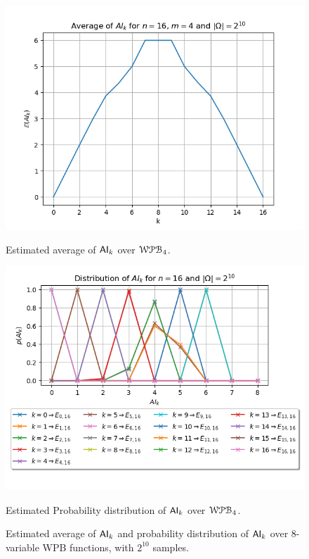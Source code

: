 \documentclass[11pt]{llncs}
\begin{document}
\begin{figure}[H]
    \centering
    \begin{minipage}[b]{0.45\textwidth}
        \centering
        \includegraphics[width=\textwidth]{images/WPB_4_sample_size_1024_average_a.png}
        \caption{Estimated average of $\mathsf{AI}_{k}$ over $\mathcal{WPB}_{4}$.}
        \label{fig:averages2014}
    \end{minipage}
    \hfill
    \begin{minipage}[b]{0.5\textwidth}
        \centering
        \includegraphics[width=\textwidth]{images/WPB_4_sample_size_1024_dist_prob_a.png}
        \caption{Estimated Probability distribution of $\mathsf{AI}_{k}$ over $\mathcal{WPB}_{4}$.}
        \label{fig:probDist2014}
    \end{minipage}
    \caption{Estimated average of $\mathsf{AI}_{k}$ and probability distribution of $\mathsf{AI}_{k}$ over $8$-variable WPB functions, with $2^{10}$ samples.}
    \label{fig:main2014}
\end{figure}
\end{document}
